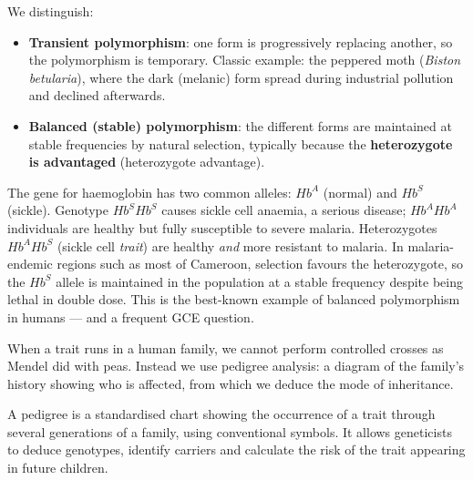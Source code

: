 \documentclass[11pt]{article}
\newcommand{\cle}[1]{{\popxbold\color{popdark}#1}}
\newcounter{popsec}
\newcounter{popsub}
\newcommand{\courssub}[1]{%
  \stepcounter{popsub}%
  \par\vspace{9pt}\noindent{\popxbold\fontsize{11.5}{13}\selectfont\color{popink}{\color{poporange}\thepopsec.\thepopsub}\hspace{6pt}#1}\par\nopagebreak\vspace{4pt}
}
\begin{document}
We distinguish:
\begin{itemize}
\item \textbf{Transient polymorphism}: one form is progressively replacing another, so the polymorphism is temporary. Classic example: the peppered moth (\emph{Biston betularia}), where the dark (melanic) form spread during industrial pollution and declined afterwards.
\item \textbf{Balanced (stable) polymorphism}: the different forms are maintained at stable frequencies by natural selection, typically because the \textbf{heterozygote is advantaged} (heterozygote advantage).
\end{itemize}

\begin{savaistu}
The gene for haemoglobin has two common alleles: $H\!b^A$ (normal) and $H\!b^S$ (sickle). Genotype $H\!b^S H\!b^S$ causes sickle cell anaemia, a serious disease; $H\!b^A H\!b^A$ individuals are healthy but fully susceptible to severe malaria. Heterozygotes $H\!b^A H\!b^S$ (sickle cell \emph{trait}) are healthy \emph{and} more resistant to malaria. In malaria-endemic regions such as most of Cameroon, selection favours the heterozygote, so the $H\!b^S$ allele is maintained in the population at a stable frequency despite being lethal in double dose. This is the best-known example of \cle{balanced polymorphism} in humans --- and a frequent GCE question.
\end{savaistu}

\courssub{Pedigree Analysis}

When a trait runs in a human family, we cannot perform controlled crosses as Mendel did with peas. Instead we use \cle{pedigree analysis}: a diagram of the family's history showing who is affected, from which we deduce the mode of inheritance.

\begin{definition}[Pedigree]
A \cle{pedigree} is a standardised chart showing the occurrence of a trait through several generations of a family, using conventional symbols. It allows geneticists to deduce genotypes, identify carriers and calculate the risk of the trait appearing in future children.
\end{definition}
\end{document}
